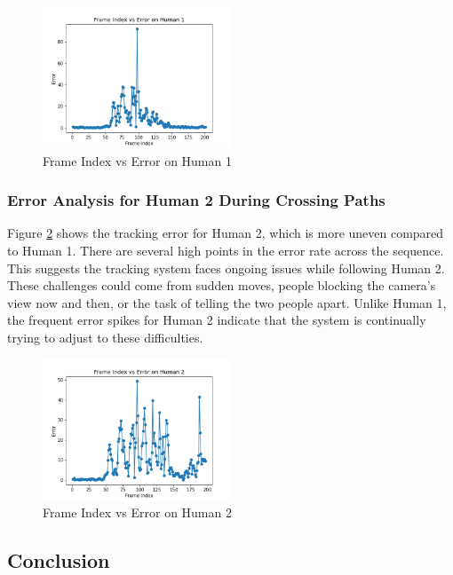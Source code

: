 \documentclass{article}
\begin{document}
\begin{figure}[H]
\centering
\includegraphics[width=0.5\textwidth]{plot_1_passing.png}
\caption{Frame Index vs Error on Human 1}
\label{fig:human1}
\end{figure}

\subsubsection{Error Analysis for Human 2 During Crossing Paths}

Figure \ref{fig:human2} shows the tracking error for Human 2, which is more uneven compared to Human 1. There are several high points in the error rate across the sequence. This suggests the tracking system faces ongoing issues while following Human 2. These challenges could come from sudden moves, people blocking the camera's view now and then, or the task of telling the two people apart. Unlike Human 1, the frequent error spikes for Human 2 indicate that the system is continually trying to adjust to these difficulties.

\begin{figure}[H]
\centering
\includegraphics[width=0.5\textwidth]{plot_2_passing.png}
\caption{Frame Index vs Error on Human 2}
\label{fig:human2}
\end{figure}


\newpage

\subsection{Conclusion}
\end{document}
